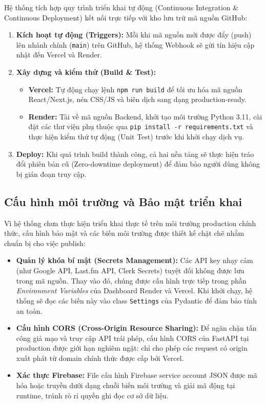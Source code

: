 \documentclass[12pt,a4paper]{report}
\begin{document}
Hệ thống tích hợp quy trình triển khai tự động (Continuous Integration \& Continuous Deployment) kết nối trực tiếp với kho lưu trữ mã nguồn GitHub:

\begin{enumerate}[leftmargin=*]
    \item \textbf{Kích hoạt tự động (Triggers):} Mỗi khi mã nguồn mới được đẩy (push) lên nhánh chính (\texttt{main}) trên GitHub, hệ thống Webhook sẽ gửi tín hiệu cập nhật đến Vercel và Render.
    \item \textbf{Xây dựng và kiểm thử (Build \& Test):}
    \begin{itemize}
        \item \textbf{Vercel:} Tự động chạy lệnh \texttt{npm run build} để tối ưu hóa mã nguồn React/Next.js, nén CSS/JS và biên dịch sang dạng production-ready.
        \item \textbf{Render:} Tải về mã nguồn Backend, khởi tạo môi trường Python 3.11, cài đặt các thư viện phụ thuộc qua \texttt{pip install -r requirements.txt} và thực hiện kiểm thử tự động (Unit Test) trước khi khởi chạy dịch vụ.
    \end{itemize}
    \item \textbf{Deploy:} Khi quá trình build thành công, cả hai nền tảng sẽ thực hiện tráo đổi phiên bản cũ (Zero-downtime deployment) để đảm bảo người dùng không bị gián đoạn truy cập.
\end{enumerate}

\subsection{Cấu hình môi trường và Bảo mật triển khai}

Vì hệ thống chưa thực hiện triển khai thực tế trên môi trường production chính thức, cấu hình bảo mật và các biến môi trường được thiết kế chặt chẽ nhằm chuẩn bị cho việc publish:
\begin{itemize}[leftmargin=*]
    \item \textbf{Quản lý khóa bí mật (Secrets Management):} Các API key nhạy cảm (như Google API, Last.fm API, Clerk Secrets) tuyệt đối không được lưu trong mã nguồn. Thay vào đó, chúng được cấu hình trực tiếp trong phần \textit{Environment Variables} của Dashboard Render và Vercel. Khi khởi chạy, hệ thống sẽ đọc các biến này vào class \texttt{Settings} của Pydantic để đảm bảo tính an toàn.
    \item \textbf{Cấu hình CORS (Cross-Origin Resource Sharing):} Để ngăn chặn tấn công giả mạo và truy cập API trái phép, cấu hình CORS của FastAPI tại production được giới hạn nghiêm ngặt: chỉ cho phép các request có origin xuất phát từ domain chính thức được cấp bởi Vercel.
    \item \textbf{Xác thực Firebase:} File cấu hình Firebase service account JSON được mã hóa hoặc truyền dưới dạng chuỗi biến môi trường và giải mã động tại runtime, tránh rò rỉ quyền ghi đọc cơ sở dữ liệu.
\end{itemize}
\end{document}
